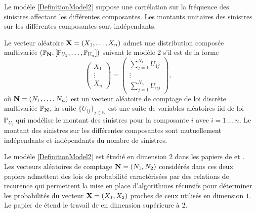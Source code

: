 Le modèle \ref{DefinitionModel2} suppose une corrélation sur la fréquence des sinistres affectant les différentes composantes. Les montants unitaires des sinistres sur les différentes composantes sont indépendants. 
\begin{Mod}\label{DefinitionModel2}
Le vecteur aléatoire $\bold{X}=(X_{1},\ldots,X_{n})$ admet une distribution composée multivariée $\left(\mathbb{P}_{\bold{N}},\left[\mathbb{P}_{U_{1}},\ldots,\mathbb{P}_{U_{n}}\right]\right)$ suivant le modèle $2$ s\rq{}il est de la forme 
\begin{equation}\label{MultivariateCompoundDistributionRV2}
\left( \begin{array}{l}
X_1 \\
\vdots\\
X_n \end{array}
\right)  =
 \displaystyle
\left( \begin{array}{l}
\sum_{j=1}^{N_{1}}U_{1j} \\
\vdots\\
\sum_{j=1}^{N_{n}}U_{nj} 
\end{array}
\right),
\end{equation}
où $\bold{N}=(N_{1},\ldots,N_{n})$ est un vecteur aléatoire de comptage de loi discrète multivariée $\mathbb{P}_{\bold{N}}$, la suite $\{U_{ij}\}_{j\in\mathbb{N}}$ est une suite de variables aléatoires \gls{iid} de loi $\mathbb{P}_{U_{i}}$ qui modélise le montant des sinistres pour la composante $i$ avec $i=1\ldots,n$. Le montant des sinistres sur les différentes composantes sont mutuellement indépendants et indépendants du nombre de sinistres. 
\end{Mod}
Le modèle \ref{DefinitionModel2} est étudié en dimension $2$ dans les papiers de \citet{He96} et \citet{Ve99}. Les vecteurs aléatoires de comptage $\bold{N}=(N_{1},N_{2})$ considérés dans ces deux papiers admettent des lois de probabilité caractérisées par des relations de recurence qui permettent la mise en place d\rq{}algorithmes récursifs pour déterminer les probabilités du vecteur $\bold{X}=(X_{1},X_{2})$ proches de ceux utilisés en dimension $1$. Le papier de \citet{Su00} étend le travail de \citet{Ve99} en dimension supérieure à $2$.\\

